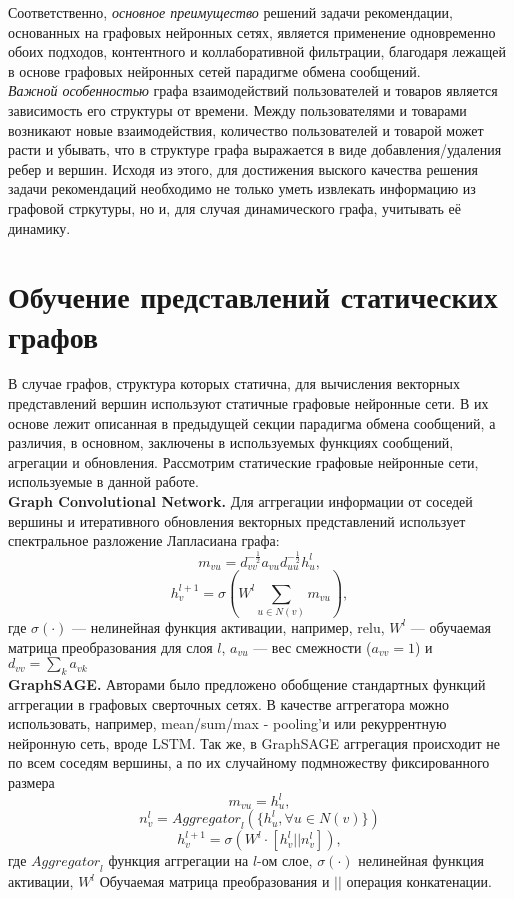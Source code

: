 \documentclass{mipt-thesis-ms}
\begin{document}
Соответственно, {\it основное преимущество} решений задачи рекомендации, основанных на графовых нейронных сетях, является применение одновременно обоих подходов, контентного и коллаборативной фильтрации, благодаря лежащей в основе графовых нейронных сетей парадигме обмена сообщений.\\

{\it Важной особенностью} графа взаимодействий пользователей и товаров является зависимость его структуры от времени. Между пользователями и товарами возникают новые взаимодействия, количество пользователей и товарой может расти и убывать, что в структуре графа выражается в виде добавления/удаления ребер и вершин. Исходя из этого, для достижения выского качества решения задачи рекомендаций необходимо не только уметь извлекать информацию из графовой стркутуры, но и, для случая динамического графа, учитывать её динамику.

\section{Обучение представлений статических графов}
В случае графов, структура которых статична, для вычисления векторных представлений вершин используют статичные графовые нейронные сети. В их основе лежит описанная в предыдущей секции парадигма обмена сообщений, а различия, в основном, заключены в используемых функциях сообщений, агрегации и обновления. Рассмотрим статические графовые нейронные сети, используемые в данной работе.\\

{\bf Graph Convolutional Network.} Для аггрегации информации от соседей вершины и итеративного обновления векторных представлений использует спектральное разложение Лапласиана графа:
$$m_{vu} = d_{vv}^{-\frac12}a_{vu}d_{uu}^{-\frac{1}{2}} h_u^l,$$
$$h_v^{l+1} = \sigma\left(W^l \sum_{u \in N(v)}m_{vu}\right),$$
где $\sigma(\cdot)$ --- нелинейная функция активации, например, relu, $W^l$ --- обучаемая матрица преобразования для слоя $l$, $a_{vu}$ --- вес смежности ($a_{vv} = 1$) и $d_{vv} = \sum_k a_{vk}$\\

{\bf GraphSAGE.} Авторами было предложено обобщение стандартных функций аггрегации в графовых сверточных сетях. В качестве аггрегатора можно использовать, например, mean/sum/max - pooling'и или рекуррентную нейронную сеть, вроде LSTM. Так же, в GraphSAGE аггрегация происходит не по всем соседям вершины, а по их случайному подмножеству фиксированного размера
$$m_{vu} = h_u^l,$$
$$n_v^l = {Aggregator}_l(\{h_u^l, \forall u \in N(v)\})$$
$$h_v^{l+1} = \sigma\left(W^l \cdot [h_v^l || n_v^l]\right),$$
где ${Aggregator}_l$ функция аггрегации на $l$-ом слое, $\sigma(\cdot)$ нелинейная функция активации, $W^l$ Обучаемая матрица преобразования и $||$ операция конкатенации.\\
\end{document}
